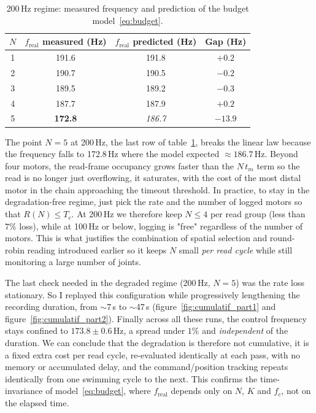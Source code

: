 \documentclass{tropLaClasse}
\begin{document}
\begin{table}[H]
\centering
\begin{tabular}{|c|c|c|c|}
\hline
$N$ & $f_{\text{real}}$ measured (Hz) & $f_{\text{real}}$ predicted (Hz) & Gap (Hz) \\ \hline
1 & 191.6 & 191.8 & $+0.2$ \\ \hline
2 & 190.7 & 190.5 & $-0.2$ \\ \hline
3 & 189.5 & 189.2 & $-0.3$ \\ \hline
4 & 187.7 & 187.9 & $+0.2$ \\ \hline
5 & \textbf{172.8} & \textit{186.7} & \textbf{$-13.9$} \\ \hline
\end{tabular}
\caption{200\,Hz regime: measured frequency and prediction of the budget model~\eqref{eq:budget}.}
\label{tab:model}
\end{table}

The point $N = 5$ at 200\,Hz, the last row of table~\ref{tab:model}, breaks the linear law because the frequency falls to 172.8\,Hz where the model expected $\approx 186.7$\,Hz. Beyond four motors, the read-frame occupancy grows faster than the $N\,t_m$ term so the read is no longer just overflowing, it saturates, with the cost of the most distal motor in the chain approaching the timeout threshold. In practice, to stay in the degradation-free regime, just pick the rate and the number of logged motors so that $R(N) \le T_c$. At 200\,Hz we therefore keep $N \le 4$ per read group (less than $7\%$ loss), while at 100\,Hz or below, logging is "free" regardless of the number of motors. This is what justifies the combination of spatial selection and round-robin reading introduced earlier so it keeps $N$ small \emph{per read cycle} while still monitoring a large number of joints.

The last check needed in the degraded regime (200\,Hz, $N = 5$) was the rate loss stationary. So I replayed this configuration while progressively lengthening the recording duration, from $\sim$7\,s to $\sim$47\,s (figure~\ref{fig:cumulatif_part1} and figure~\ref{fig:cumulatif_part2}). Finally across all these runs, the control frequency stays confined to $173.8 \pm 0.6$\,Hz, a spread under $1\%$ and \emph{independent} of the duration. We can conclude that the degradation is therefore not cumulative, it is a fixed extra cost per read cycle, re-evaluated identically at each pass, with no memory or accumulated delay, and the command/position tracking repeats identically from one swimming cycle to the next. This confirms the time-invariance of model~\eqref{eq:budget}, where $f_{\text{real}}$ depends only on $N$, $K$ and $f_c$, not on the elapsed time.
\end{document}
